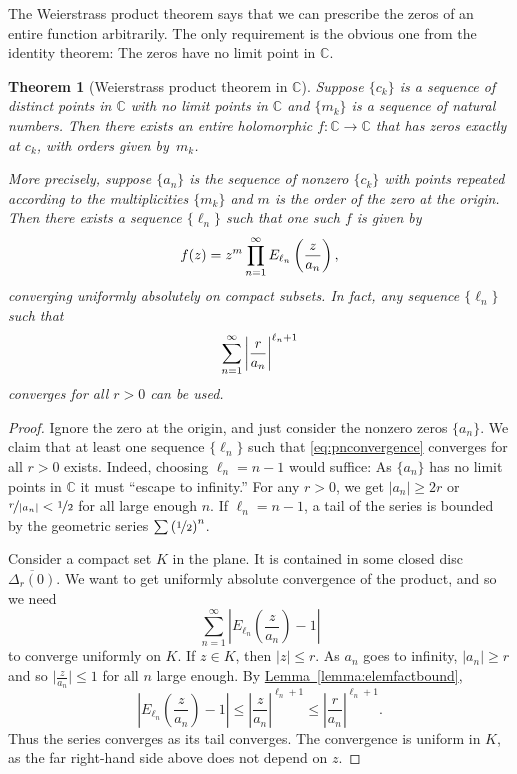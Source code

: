 \documentclass[12pt,openany]{book}
\newcommand{\avoidbreak}{\postdisplaypenalty=100}
\newcommand{\sabs}[1]{\lvert {#1} \rvert}
\newcommand{\babs}[1]{\bigl\lvert {#1} \bigr\rvert}
\newcommand{\abs}[1]{\left\lvert {#1} \right\rvert}
\newcommand{\C}{{\mathbb{C}}}
\newcommand{\myquote}[1]{``#1''}
\theoremstyle{plain}
\newtheorem{thm}{Theorem}[section]
\theoremstyle{remark}
\theoremstyle{definition}
\theoremstyle{exercise}
\theoremstyle{example}
\newcommand{\lemmaref}[1]{\hyperref[#1]{Lemma~\ref*{#1}}}
\begin{document}
The Weierstrass product theorem says that
we can prescribe the zeros of an entire function arbitrarily.
The only requirement is the obvious one from the identity theorem:
The zeros have no limit point in $\C$.

\begin{thm}[Weierstrass product theorem in $\C$]
\index{Weierstrass product theorem in $\C$}
Suppose $\{ c_k \}$ is a sequence of distinct points in $\C$
with no limit points in $\C$ and $\{ m_k \}$ is a sequence of
natural numbers.
Then there exists an entire holomorphic $f \colon \C \to \C$ that
has zeros exactly at $c_k$, with orders given by~$m_k$.

More precisely, suppose $\{ a_n \}$ is the sequence of nonzero $\{ c_k \}$ with points
repeated according to the multiplicities $\{ m_k \}$ and $m$
is the order of the zero at the origin.
Then there exists a
sequence $\{ \ell_n \}$ such that one such $f$ is given by
\begin{equation*}
f(z) = z^m \prod_{n=1}^\infty E_{\ell_n}\left(\frac{z}{a_n}\right) ,
\avoidbreak
\end{equation*}
converging uniformly absolutely on compact subsets.
In fact, any sequence $\{ \ell_n \}$ such that
\begin{equation} \label{eq:pnconvergence}
\sum_{n=1}^\infty {\abs{\frac{r}{a_n}}}^{\ell_n+1}
\avoidbreak
\end{equation}
converges for all $r > 0$ can be used.
\end{thm}

\begin{proof}
Ignore the zero at the origin, and just consider the nonzero
zeros $\{ a_n \}$.  We claim that at least one sequence $\{ \ell_n \}$
such that \eqref{eq:pnconvergence} converges for all $r > 0$ exists.
Indeed, choosing $\ell_n = n-1$ would suffice:
As $\{ a_n \}$ has no limit points in $\C$ it must
\myquote{escape to infinity.}
For any $r > 0$, we get $\sabs{a_n} \geq 2r$ or
$\nicefrac{r}{\abs{a_n}} < \nicefrac{1}{2}$
for all large enough $n$.
If $\ell_n = n-1$, a tail of the series is bounded
by the geometric series $\sum {(\nicefrac{1}{2})}^n$.

Consider a compact set $K$ in the plane.  It is contained in some closed disc
$\overline{\Delta_r(0)}$.  We want to get uniformly absolute convergence
of the product, and so we need
\begin{equation*}
\sum_{n=1}^\infty \abs{ E_{\ell_n}\left(\frac{z}{a_n}\right)-1}
\end{equation*}
to converge uniformly on $K$.
If $z \in K$, then $\sabs{z}\leq r$.  As $a_n$ goes to
infinity,
$\sabs{a_n} \geq r$
and so $\babs{\frac{z}{a_n}} \leq 1$
for all $n$ large enough.
By \lemmaref{lemma:elemfactbound},
\begin{equation*}
\abs{ E_{\ell_n}\left(\frac{z}{a_n}\right)-1}
\leq
\abs{\frac{z}{a_n}}^{\ell_n+1}
\leq
\abs{\frac{r}{a_n}}^{\ell_n+1} .
\end{equation*}
Thus the series converges as its tail converges.  The convergence
is uniform in $K$, as the far right-hand side above does not depend on $z$.
\end{proof}
\end{document}
